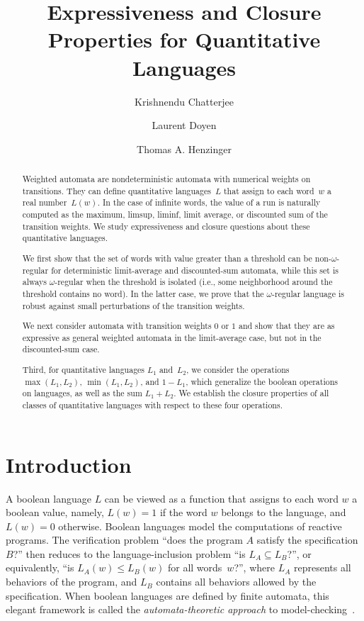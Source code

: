 \documentclass{llncs}
\title{Expressiveness and Closure Properties for Quantitative Languages}
\author{Krishnendu Chatterjee\inst{1} \and Laurent Doyen\inst{2} \and Thomas A. Henzinger\inst{2}}
\institute{IST, Austria \\
\and EPFL, Lausanne, Switzerland
}
\begin{document}
\pagestyle{plain}
\maketitle

\begin{abstract}
Weighted automata are nondeterministic automata with numerical weights on
transitions. They can define quantitative languages~$L$ that
assign to each word~$w$ a real number~$L(w)$.
In the case of infinite words, the value of a run is naturally computed as
the maximum, limsup, liminf, limit average, or discounted sum of the
transition weights.
We study expressiveness and closure questions about these quantitative
languages.

We first show that the set of words with value greater than a threshold
can be non-$\omega$-regular for deterministic limit-average and
discounted-sum
automata, while this set is always $\omega$-regular when the threshold
is isolated (i.e., some neighborhood around the threshold contains 
no word).
In the latter case, we prove that the $\omega$-regular language is robust
against small perturbations of the transition weights.

We next consider automata with transition weights $0$ or $1$ and show that they
are as expressive as general weighted automata in the limit-average case, but not
in the discounted-sum case.

Third, for quantitative languages $L_1$ and~$L_2$, we consider the operations
$\max(L_1,L_2)$, $\min(L_1,L_2)$, and $1-L_1$, which generalize
the boolean operations on languages, as well as the sum $L_1 + L_2$.
We establish the closure properties of all classes
of quantitative languages with respect to these four operations.
 

\end{abstract}


\section{Introduction}
A boolean language $L$ can be viewed as a function that assigns to each word $w$ a boolean value,
namely, $L(w) = 1$ if the word $w$ belongs to the language, and $L(w) = 0$ otherwise. 
Boolean languages model the computations of reactive programs. The verification
problem ``does the program $A$ satisfy the specification $B$?'' 
then reduces to the language-inclusion problem ``is $L_A \subseteq L_B$?'',
or equivalently, ``is $L_{A}(w)\leq L_{B}(w)$ for all words~$w$?'',
where $L_A$ represents all behaviors of the program, and $L_B$ contains 
all behaviors allowed by the specification. When boolean languages are defined
by finite automata, this elegant framework
is called the \emph{automata-theoretic approach} to model-checking~\cite{VardiW86}.
\end{document}
